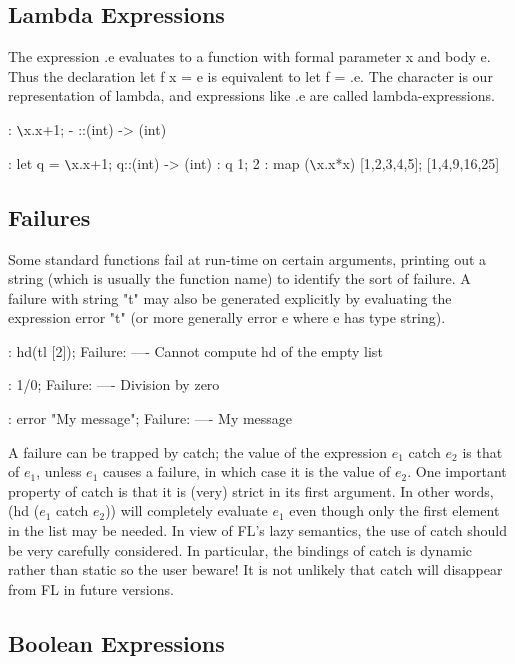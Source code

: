 \subsection{Lambda Expressions}

The expression \verb@\@x.e evaluates to a function with formal parameter x
and body e. Thus the
declaration let f x = e is equivalent to let f = \verb@\@x.e. The character
\verb@\@ is our representation of lambda,
and expressions like \verb@\@x.e are called lambda-expressions.
\begin{hol}
: \verb!\!x.x+1;
- ::(int) -> (int)

: let q = \verb!\!x.x+1;
q::(int) -> (int)
: q 1;
2
: map (\verb!\!x.x*x) [1,2,3,4,5];
[1,4,9,16,25]
\end{hol}

\subsection{Failures}

Some standard functions fail at run-time on certain arguments, printing
out a string (which is usually the function name) to identify the sort
of failure. A failure with string "t" may also be
generated explicitly by evaluating the expression error "t" (or more
generally error e where e has type string).
\begin{hol}
: hd(tl [2]);
Failure:    ----  Cannot compute hd of the empty list

: 1/0;
Failure:    ----  Division by zero


: error "My message";
Failure:    ----   My message
\end{hol}

A failure can be trapped by catch; the value of the expression $e_1$ catch
$e_2$ is that of $e_1$, unless
$e_1$ causes a failure, in which case it is the value of $e_2$. One important
property of catch is that it is
(very) strict in its first argument. In other words, (hd ($e_1$ catch
$e_2$)) will completely evaluate $e_1$
even though only the first element in the list may be needed. In view
of FL's lazy semantics, the
use of catch should be very carefully considered. In particular, the
bindings of catch is dynamic
rather than static so the user beware! It is not unlikely that catch
will disappear from FL in future
versions.

\subsection{Boolean Expressions}

